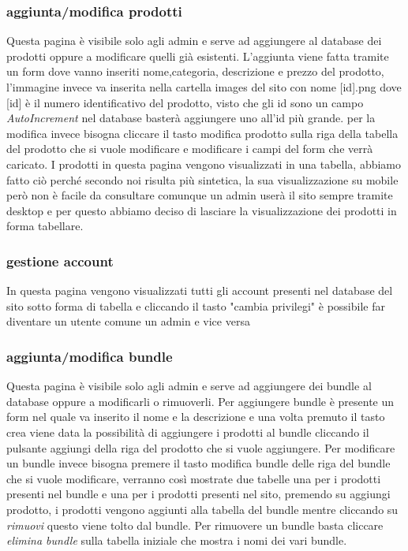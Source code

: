 \subsubsection{aggiunta/modifica prodotti}
Questa pagina è visibile solo agli admin e serve ad aggiungere al database dei prodotti oppure a modificare quelli già esistenti.\newline
L'aggiunta viene fatta tramite un form dove vanno inseriti nome,categoria, descrizione e prezzo del prodotto, l'immagine invece va inserita nella cartella images del sito con nome [id].png dove [id] è il numero identificativo del prodotto, visto che gli id sono un campo \emph{AutoIncrement} nel database basterà aggiungere uno all'id più grande.\newline
per la modifica invece bisogna cliccare il tasto modifica prodotto sulla riga della tabella del prodotto che si vuole modificare e modificare i campi del form che verrà caricato.\newline
I prodotti in questa pagina vengono visualizzati in una tabella, abbiamo fatto ciò perché secondo noi risulta più sintetica, la sua visualizzazione su mobile però non è facile da consultare comunque un admin userà il sito sempre tramite desktop e per questo abbiamo deciso di lasciare la visualizzazione dei prodotti in forma tabellare.

\subsubsection{gestione account}
In questa pagina vengono visualizzati tutti gli account presenti nel database del sito sotto forma di tabella e cliccando il tasto "cambia privilegi" è possibile far diventare un utente comune un admin e vice versa

\subsubsection{aggiunta/modifica bundle}
Questa pagina è visibile solo agli admin e serve ad aggiungere dei bundle al database oppure a modificarli o rimuoverli.
Per aggiungere bundle è presente un form nel quale va inserito il nome e la descrizione e una volta premuto il tasto crea viene data la possibilità di aggiungere i prodotti al bundle cliccando il pulsante aggiungi della riga del prodotto che si vuole aggiungere.\newline
Per modificare un bundle invece bisogna premere il tasto modifica bundle delle riga del bundle che si vuole modificare, verranno così mostrate due tabelle una per i prodotti presenti nel bundle e una per i prodotti presenti nel sito, premendo su aggiungi prodotto, i prodotti vengono aggiunti alla tabella del bundle mentre cliccando su \emph{rimuovi} questo viene tolto dal bundle.\newline
Per rimuovere un bundle basta cliccare \emph{elimina bundle} sulla tabella iniziale che mostra i nomi dei vari bundle.

